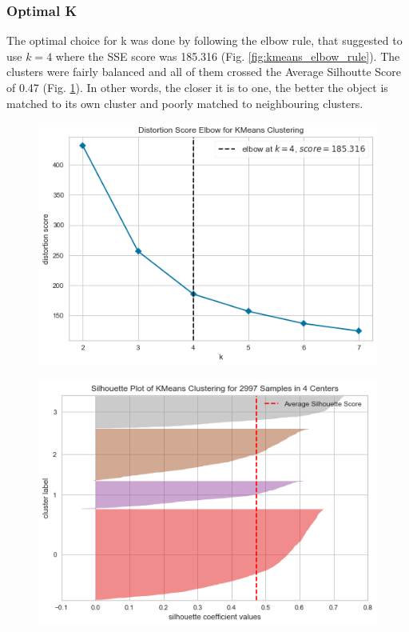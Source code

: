 \subsubsection{Optimal K}
The optimal choice for k was done by following the elbow rule, that suggested to use $k=4$ where the SSE score was 185.316 (Fig. \ref{fig:kmeans_elbow_rule}). The clusters were fairly balanced and all of them crossed the Average Silhoutte Score of 0.47 (Fig. \ref{fig:kmeans_silhouette_score}). In other words, the closer it is to one, the better the object is matched to its own cluster and poorly matched to neighbouring clusters.


\begin{figure}[!h]
\centering
\begin{minipage}{.5\textwidth}
\centering
\includegraphics[width=\textwidth]{plots/kmeans/kmeans_elbow_rule}
\label{fig:kmeans_elbow_rule}
\end{minipage}%
\begin{minipage}{.5\textwidth}
\centering
\includegraphics[width=\textwidth]{plots/kmeans/kmeans_silhouette_score}
\label{fig:kmeans_silhouette_score}
\end{minipage}
\end{figure}

